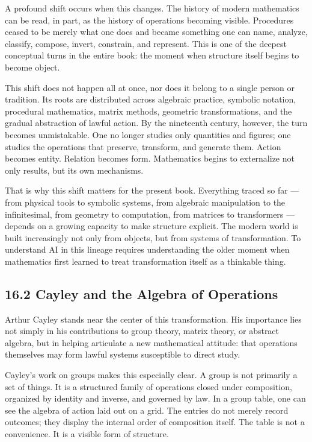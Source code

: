\documentclass[
]{article}
\begin{document}
A profound shift occurs when this changes. The history of modern
mathematics can be read, in part, as the history of operations becoming
visible. Procedures ceased to be merely what one does and became
something one can name, analyze, classify, compose, invert, constrain,
and represent. This is one of the deepest conceptual turns in the entire
book: the moment when structure itself begins to become object.

This shift does not happen all at once, nor does it belong to a single
person or tradition. Its roots are distributed across algebraic
practice, symbolic notation, procedural mathematics, matrix methods,
geometric transformations, and the gradual abstraction of lawful action.
By the nineteenth century, however, the turn becomes unmistakable. One
no longer studies only quantities and figures; one studies the
operations that preserve, transform, and generate them. Action becomes
entity. Relation becomes form. Mathematics begins to externalize not
only results, but its own mechanisms.

That is why this shift matters for the present book. Everything traced
so far --- from physical tools to symbolic systems, from algebraic
manipulation to the infinitesimal, from geometry to computation, from
matrices to transformers --- depends on a growing capacity to make
structure explicit. The modern world is built increasingly not only from
objects, but from systems of transformation. To understand AI in this
lineage requires understanding the older moment when mathematics first
learned to treat transformation itself as a thinkable thing.

\hypertarget{cayley-and-the-algebra-of-operations}{%
\subsection{16.2 Cayley and the Algebra of
Operations}\label{cayley-and-the-algebra-of-operations}}

Arthur Cayley stands near the center of this transformation. His
importance lies not simply in his contributions to group theory, matrix
theory, or abstract algebra, but in helping articulate a new
mathematical attitude: that operations themselves may form lawful
systems susceptible to direct study.

Cayley's work on groups makes this especially clear. A group is not
primarily a set of things. It is a structured family of operations
closed under composition, organized by identity and inverse, and
governed by law. In a group table, one can see the algebra of action
laid out on a grid. The entries do not merely record outcomes; they
display the internal order of composition itself. The table is not a
convenience. It is a visible form of structure.
\end{document}
